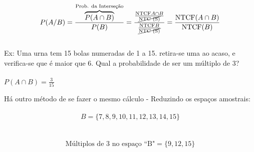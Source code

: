 \documentclass{article}
\begin{document}
\[P(A/B) = \frac{\overbrace{P(A\cap B)}^{\text{Prob. da Interseção}}}{P(B)} = \frac{\frac{\text{NTCF}A\cap B}{\cancel{\text{NTC (S)}}}}{\frac{\text{NTCF}B}{\cancel{\text{NTC (S)}}}}=\frac{\text{NTCF}(A \cap B)}{\text{NTCF} (B)}\]\\

Ex: \; Uma urna tem 15 bolas numeradas de 1 a 15. retira-se uma ao acaso, e verifica-se que é maior que 6. Qual a probabilidade de ser um múltiplo de 3?\\


{}\\
$P(A \cap B) = \frac{3}{15} $


Há outro método de se fazer o mesmo cálculo - Reduzindo os espaços amostrais:\\

\\

\[{B = \{7,8,9,10,11,12,13,14,15\}}\]\\

\\

\[\text{Múltiplos de 3 no espaço ``B"} = \{9,12,15\}\]\\
\end{document}
